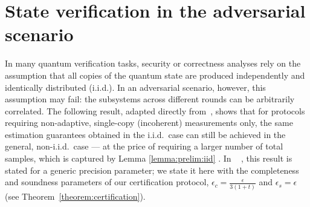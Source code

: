 \documentclass[a4paper,twocolumn,11pt,unpublished]{../../revision/quantumarticle}
\providecommand{\DIFadd}[1]{{\protect\color{blue} \sf #1}} %
\providecommand{\DIFaddbegin}{} %
\providecommand{\DIFaddend}{} %
\begin{document}
\section{State verification in the adversarial scenario}
\label{section:verification}

In many quantum verification tasks, security or correctness analyses rely on the assumption that all copies of the quantum state are produced independently and identically distributed (i.i.d.).
In an adversarial scenario, however, this assumption may fail: the subsystems across different rounds can be arbitrarily correlated.
The following result, adapted directly from~\cite[Theorem~3]{FKMO24learning}, shows that for protocols requiring non-adaptive, single-copy (incoherent) measurements only, the same estimation guarantees obtained in the i.i.d.\ case can still be achieved in the general, non-i.i.d.\ case — at the price of requiring a larger number of total samples, which is captured by Lemma \ref{lemma:prelim:iid}\DIFaddbegin \DIFadd{. In \mbox{%
\cite{FKMO24learning}}\hskip0pt%
, this result is stated for a generic precision parameter; we state it here with the completeness and soundness parameters of our certification protocol, $\epsilon_c=\frac{\epsilon}{3(1+t)}$ and $\epsilon_s=\epsilon$ (see Theorem~\ref{theorem:certification})}\DIFaddend .
\end{document}
